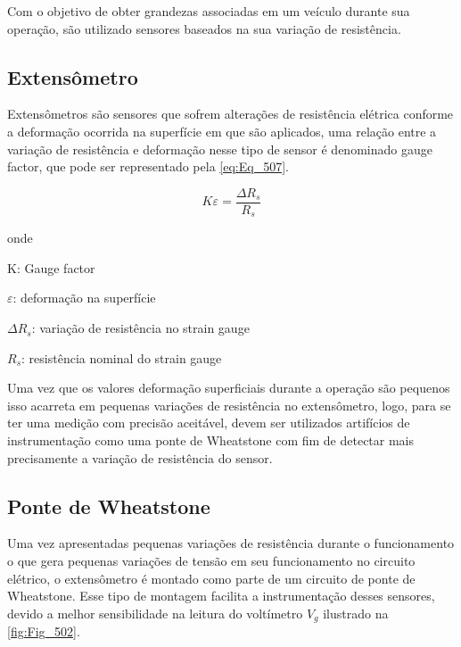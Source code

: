 Com o objetivo de obter grandezas associadas em um veículo durante sua operação, são utilizado sensores baseados na sua variação de resistência.

\subsection{Extensômetro}

Extensômetros são sensores que sofrem alterações de resistência elétrica conforme a deformação ocorrida na superfície em que são aplicados, uma relação entre a variação de resistência e deformação nesse tipo de sensor é denominado gauge factor, que pode ser representado pela \autoref{eq:Eq_507}.

\begin{equation}\label{eq:Eq_507}
K\varepsilon = \frac{\Delta R_{s}}{R_{s}}
\end{equation}

onde

K: Gauge factor

$\varepsilon$: deformação na superfície

$\Delta R_{s}$: variação de resistência no strain gauge

$R_{s}$: resistência nominal do strain gauge

\vspace{\baselineskip}

Uma vez que os valores deformação superficiais durante a operação são pequenos isso acarreta em pequenas variações de resistência no extensômetro, logo, para se ter uma medição com precisão aceitável, devem ser utilizados artifícios de instrumentação como uma ponte de Wheatstone com fim de detectar mais precisamente a variação de resistência do sensor.


\subsection{Ponte de Wheatstone}

Uma vez apresentadas pequenas variações de resistência durante o funcionamento o que gera pequenas variações de tensão em seu funcionamento no circuito elétrico, o extensômetro é montado como parte de um circuito de ponte de Wheatstone. Esse tipo de montagem facilita a instrumentação desses sensores, devido a melhor sensibilidade na leitura do voltímetro $V_g$ ilustrado na \autoref{fig:Fig_502}.

